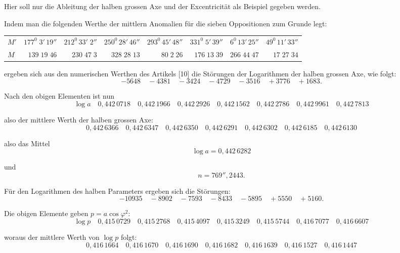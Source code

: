 \begin{landscape}
\endgroup
\par\noindent\hspace*{\parindent}Hier soll nur die Ableitung der halben grossen Axe und der Excentricität als Beispiel gegeben werden.
\par\noindent\hspace*{\parindent}Indem man die folgenden Werthe der mittlern Anomalien für die sieben Oppositionen zum Grunde legt:
\begingroup
\small\setlength{\tabcolsep}{5pt}\renewcommand{\arraystretch}{1.18}
\begin{center}
\begin{tabular}{@{}lrrrrrrr@{}}
\(M'\)&\(177^0\;3'\,19''\)&\(212^0\,33'\;2''\)&\(250^0\,28'\,46''\)&\(293^0\,45'\,48''\)&\(331^0\;5'\,39''\)&\(6^0\,13'\,25''\)&\(49^0\,11'\,33''\)\\
\(M\)&\(139\;19\;46\)&\(230\;47\;3\)&\(328\;28\;13\)&\(80\;2\;26\)&\(176\;13\;39\)&\(266\;44\;47\)&\(17\;27\;34\)
\end{tabular}
\end{center}
\endgroup
\par\noindent ergeben sich aus den numerischen Werthen des Artikels [10] die Störungen der Logarithmen der halben grossen Axe, wie folgt:
\[
-5648\quad-4381\quad-3424\quad-4729\quad-3516\quad+3776\quad+1683.
\]
\par\noindent Nach den obigen Elementen ist nun
\[
\log a\quad 0{,}442\,0718\quad0{,}442\,1966\quad0{,}442\,2926\quad0{,}442\,1562\quad0{,}442\,2786\quad0{,}442\,9961\quad0{,}442\,7813
\]
\par\noindent also der mittlere Werth der halben grossen Axe:
\[
0{,}442\,6366\quad0{,}442\,6347\quad0{,}442\,6350\quad0{,}442\,6291\quad0{,}442\,6302\quad0{,}442\,6185\quad0{,}442\,6130
\]
\par\noindent also das Mittel
\[
\log a=0{,}442\,6282
\]
\par\noindent und
\[
n=769''{,}2443.
\]
\par\noindent\hspace*{\parindent}Für den Logarithmen des halben Parameters ergeben sich die Störungen:
\[
-10935\quad-8902\quad-7593\quad-8433\quad-5895\quad+5550\quad+5160.
\]
\par\noindent Die obigen Elemente geben \(p=a\cos\varphi^2\):
\[
\log p\quad0{,}415\,0729\quad0{,}415\,2768\quad0{,}415\,4097\quad0{,}415\,3249\quad0{,}415\,5744\quad0{,}416\,7077\quad0{,}416\,6607
\]
\par\noindent woraus der mittlere Werth von \(\log p\) folgt:
\[
0{,}416\,1664\quad0{,}416\,1670\quad0{,}416\,1690\quad0{,}416\,1682\quad0{,}416\,1639\quad0{,}416\,1527\quad0{,}416\,1447
\]
\end{landscape}
